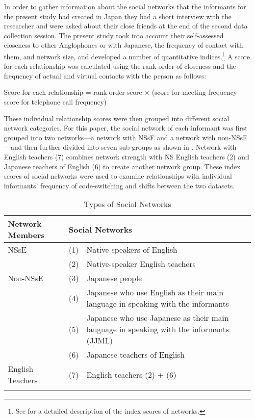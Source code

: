 \documentclass[output=paper]{LSP/langsci}
\begin{document}
In order to gather information about the social networks that the informants for the present study had created in Japan they had a short interview with the researcher and were asked about their close friends at the end of the second data collection session. The present study took into account their self-assessed closeness to other Anglophones or with Japanese, the frequency of contact with them, and network size, and developed a number of quantitative indices.\footnote{See \citet{hirano_dialect_2013} for a detailed description of the index scores of networks.} A score for each relationship was calculated using the rank order of closeness and the frequency of actual and virtual contacts with the person as follows:

Score for each relationship =   rank order score × (score for meeting frequency + score for             telephone call frequency)

These individual relationship scores were then grouped into different social network categories. For this paper, the social network of each informant was first grouped into two networks—a network with NSsE and a network with non-NSsE—and then further divided into seven sub-groups as shown in . Network with English teachers (7) combines network strength with NS English teachers (2) and Japanese teachers of English (6) to create another network group. These index scores of social networks were used to examine relationships with individual informants’ frequency of code-switching and shifts between the two datasets.

\begin{table}
\begin{tabular}{lll}
\lsptoprule
Network Members & \multicolumn{2}{l}{Social Networks}\\
\midrule
NSsE & (1) & Native speakers of English\\
& (2) & Native-speaker English teachers\\
Non-NSsE & (3) & Japanese people\\
& (4) & \begin{minipage}[t]{0.6\textwidth}Japanese who use English as their main language in speaking with the informants\end{minipage}   \\
& (5) & \begin{minipage}[t]{0.6\textwidth}Japanese who use Japanese as their main language in speaking with the informants (JJML)\end{minipage}\\
& (6) & Japanese teachers of English\\
English Teachers & (7) & English teachers (2) + (6)\\
\lspbottomrule
\end{tabular}
\label{tab:1}
\caption{Types of Social Networks}
\end{table}
\end{document}
